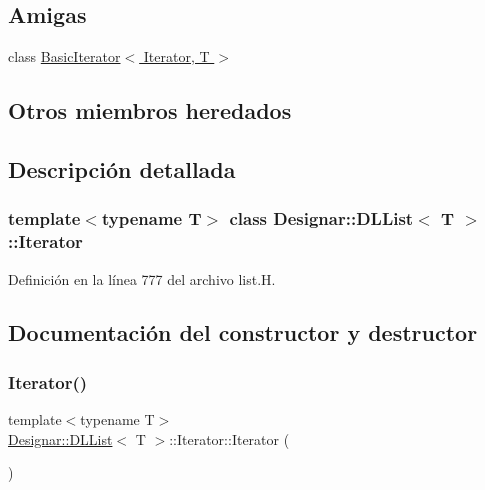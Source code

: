 \subsection*{Amigas}
\begin{DoxyCompactItemize}
\item 
class \hyperlink{class_designar_1_1_d_l_list_1_1_iterator_ae3421d6be56b523bf3c41ceb29f3e5d7}{Basic\+Iterator$<$ Iterator, T $>$}
\end{DoxyCompactItemize}
\subsection*{Otros miembros heredados}


\subsection{Descripción detallada}
\subsubsection*{template$<$typename T$>$\newline
class Designar\+::\+D\+L\+List$<$ T $>$\+::\+Iterator}



Definición en la línea 777 del archivo list.\+H.



\subsection{Documentación del constructor y destructor}
\mbox{\label{class_designar_1_1_d_l_list_1_1_iterator_a2d2ee7eeaa63b3b2e051a76fb4c4e164}} 
\subsubsection{\texorpdfstring{Iterator()}{Iterator()}\hspace{0.1cm}{\footnotesize\ttfamily [1/5]}}
{\footnotesize\ttfamily template$<$typename T$>$ \\
\hyperlink{class_designar_1_1_d_l_list}{Designar\+::\+D\+L\+List}$<$ T $>$\+::Iterator\+::\+Iterator (\begin{DoxyParamCaption}{ }\end{DoxyParamCaption})\hspace{0.3cm}{\ttfamily [inline]}}



